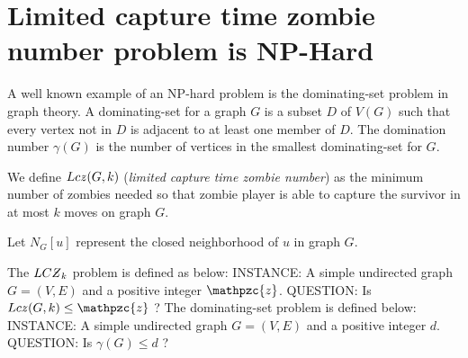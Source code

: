 \documentclass[1p]{elsarticle}
\newcommand{\NPZ}{\ooalign{$Z$\cr\hfil\rule[.8ex]{.3em}{.09ex}\hfil\cr}}
\newcommand{\zn}{\ooalign{$z$\cr\hfil\rule[.5ex]{.2em}{.08ex}\hfil\cr}}
\begin{document}
\section{Limited capture time zombie number problem is NP-Hard}\label{np-capturetime} 

	A well known example of an NP-hard problem is the dominating-set problem in graph theory\cite{Hopcroft07}. A
	dominating-set for a graph $G$ is a subset $D$ of $V(G)$ such that every vertex not in $D$ is adjacent to at least
	one member of $D$. The domination number $\gamma(G)$ is the number of vertices in the smallest dominating-set for
	$G$.

	We define $Lc\zn(G,k)$ ({\it limited capture time zombie number}) as the minimum number of zombies needed so that
	zombie player is able to capture the survivor in at most $k$ moves on graph $G$. 

	Let $N_G[u]$ represent the closed neighborhood of $u$ in graph $G$.
	
	The $LC\NPZ_k$ problem is defined as below:
	{\newline}
	INSTANCE: A simple undirected graph $G = (V,E)$ and a positive integer $\mathpzc{z}$.
	{\newline}
	QUESTION: Is $Lc\zn(G,k) \leq \mathpzc{z}$ ?
	{\newline}
	{\newline}
	The dominating-set problem is defined below:
	{\newline}
	INSTANCE: A simple undirected graph $G = (V,E)$ and a positive integer $d$.
	{\newline}
	QUESTION: Is $\gamma(G) \leq d$ ?
\end{document}
